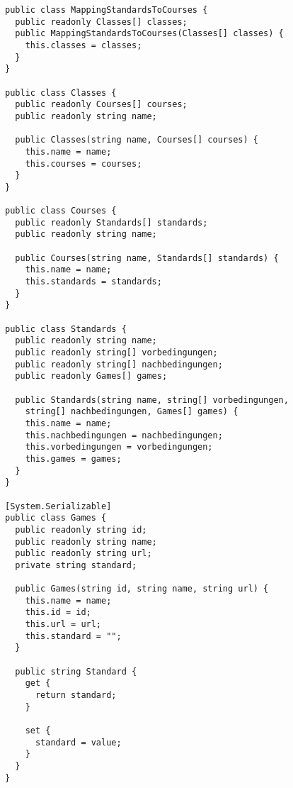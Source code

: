 \begin{scriptsize}
				\lstset{
					float,
					caption=Skript: MappingStandardsToCourses.cs, 
					language=[Sharp]C, 
					frame=single,  
					showstringspaces=false, 
					showspaces=false, 
					numbers=left, 
					captionpos=b, 
					belowcaptionskip=4pt,
					basicstyle=\ttfamily
				} 
				\begin{lstlisting}[label=lst:methode3]
public class MappingStandardsToCourses {
  public readonly Classes[] classes;
  public MappingStandardsToCourses(Classes[] classes) {
    this.classes = classes;
  }
}

public class Classes {
  public readonly Courses[] courses;
  public readonly string name; 

  public Classes(string name, Courses[] courses) {
    this.name = name; 
    this.courses = courses; 
  }
}

public class Courses {
  public readonly Standards[] standards;
  public readonly string name; 

  public Courses(string name, Standards[] standards) {
    this.name = name;
    this.standards = standards;
  }
}
    
public class Standards {
  public readonly string name;
  public readonly string[] vorbedingungen;
  public readonly string[] nachbedingungen;
  public readonly Games[] games;

  public Standards(string name, string[] vorbedingungen, 
    string[] nachbedingungen, Games[] games) {
    this.name = name; 
    this.nachbedingungen = nachbedingungen;
    this.vorbedingungen = vorbedingungen; 
    this.games = games;
  }
}

[System.Serializable]
public class Games {
  public readonly string id;
  public readonly string name;
  public readonly string url;
  private string standard;

  public Games(string id, string name, string url) {
    this.name = name;
    this.id = id;
    this.url = url;
    this.standard = "";
  }

  public string Standard {
    get {
      return standard;
    }

    set {
      standard = value;
    }
  }
}
				\end{lstlisting}
			\end{scriptsize}
